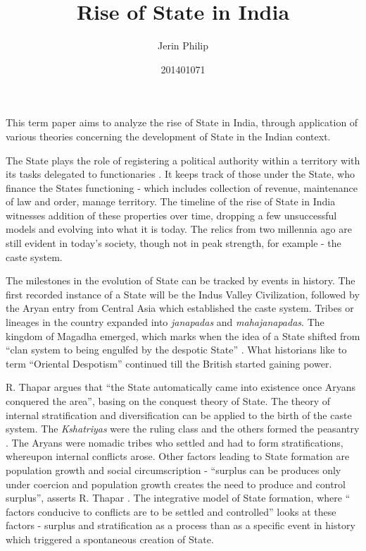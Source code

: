 \documentclass[a4paper]{article}
\title{Rise of State in India}
\author{Jerin Philip}
\date{201401071}
\begin{document}
\maketitle
This term paper aims to analyze the rise of State in India, through
application of various theories concerning the development of State in
the Indian context.  

The State plays the role of registering a political authority within a
territory with its tasks delegated to functionaries \cite[p.
11]{thapar1984lineage}. It keeps track of \cite[p.
12-13]{thapar1984lineage} those under the State, who finance the States
functioning - which includes collection of revenue, maintenance of law
and order, manage territory. The timeline of the rise of State in India
witnesses addition of these properties over time, dropping a few
unsuccessful models and evolving into what it is today. The relics from
two millennia ago are still evident in today's society, though not in
peak strength, for example - the caste system.

The milestones in the evolution of State can be tracked by events in
history.  The first recorded instance of a State will be the Indus
Valley Civilization, followed by the Aryan entry from Central Asia which
established the caste system. Tribes or lineages in the country expanded
into \textit{janapadas} and \textit{mahajanapadas}. The kingdom of
Magadha emerged, which marks when the idea of a State shifted from
``clan system to being engulfed by the despotic State'' \cite[p.
5]{thapar1984lineage}. What historians like to term ``Oriental
Despotism'' continued till the British started gaining power. 

R. Thapar argues \cite[p.4]{thapar1984lineage} that ``the State
automatically came into existence once Aryans conquered the area'',
basing on the conquest theory of State. The theory of internal
stratification and diversification can be applied to the birth of the
caste system. The \textit{Kshatriyas} were the ruling class and the
others formed the peasantry \cite[p.  4]{thapar1984lineage}. The Aryans
were nomadic tribes who settled and had to form stratifications,
whereupon internal conflicts arose. Other factors leading to State
formation are population growth and social circumscription - ``surplus
can be produces only under coercion and population growth creates the
need to produce and control surplus'', asserts R. Thapar \cite[p.
8]{thapar1984lineage}. The integrative model of State formation, where
`` factors conducive to conflicts are to be settled and controlled''
\cite[p. 8]{thapar1984lineage} looks at these factors - surplus and
stratification as a process than as a specific event in history which
triggered a spontaneous creation of State. 
\end{document}
